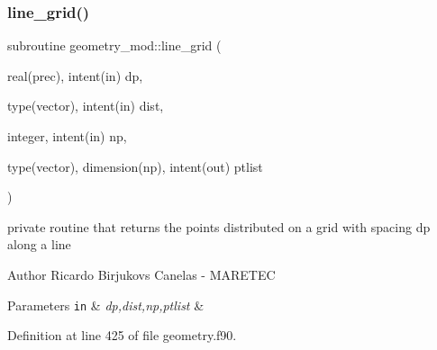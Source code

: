 \subsubsection{\texorpdfstring{line\+\_\+grid()}{line\_grid()}}
{\footnotesize\ttfamily subroutine geometry\+\_\+mod\+::line\+\_\+grid (\begin{DoxyParamCaption}\item[{real(prec), intent(in)}]{dp,  }\item[{type(vector), intent(in)}]{dist,  }\item[{integer, intent(in)}]{np,  }\item[{type(vector), dimension(np), intent(out)}]{ptlist }\end{DoxyParamCaption})\hspace{0.3cm}{\ttfamily [private]}}



private routine that returns the points distributed on a grid with spacing dp along a line ~\newline
 

\begin{DoxyAuthor}{Author}
Ricardo Birjukovs Canelas -\/ M\+A\+R\+E\+T\+EC 
\end{DoxyAuthor}

\begin{DoxyParams}[1]{Parameters}
\mbox{\tt in}  & {\em dp,dist,np,ptlist} & \\
\hline
\end{DoxyParams}


Definition at line 425 of file geometry.\+f90.


